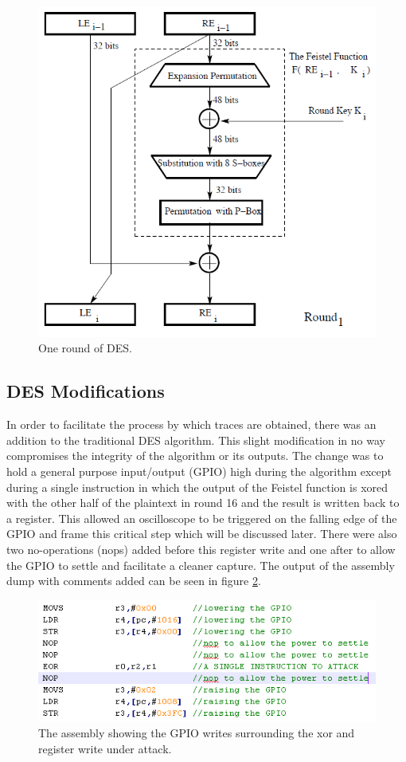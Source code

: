 	\begin{figure}[h]
	\centering
	\includegraphics[width=0.7\linewidth]{./round}
	\caption{One round of DES.}
	\label{fig:round}
	\end{figure}




\subsection{DES Modifications}
	In order to facilitate the process by which traces are obtained, there was an addition to the traditional DES algorithm.  This slight modification in no way compromises the integrity of the algorithm or its outputs.  The change was to hold a general purpose input/output (GPIO) high during the algorithm except during a single instruction in which the output of the Feistel function is xored with the other half of the plaintext in round 16 and the result is written back to a register.  This allowed an oscilloscope to be triggered on the falling edge of the GPIO and frame this critical step which will be discussed later.  There were also two no-operations (nops) added before this register write and one after to allow the GPIO to settle and facilitate a cleaner capture.  The output of the assembly dump with comments added can be seen in figure \ref{fig:asm_snippet}.
	
	\begin{figure}[h]
	\centering
	\includegraphics[width=0.7\linewidth]{./asm_snippet}
	\caption{The assembly showing the GPIO writes surrounding the xor and register write under attack.}
	\label{fig:asm_snippet}
	\end{figure}

